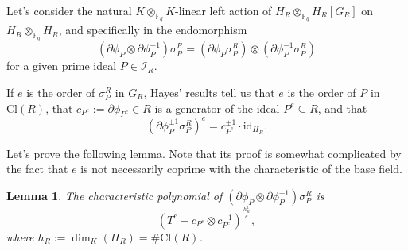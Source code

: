 \documentclass[11pt]{amsart}
\numberwithin{equation}{section}
\newcommand{\FF}{\mathbb{F}}
\newtheorem{Lemma}[Theorem]{Lemma}
\begin{document}
Let's consider the natural $K\otimes_{\FF_q} K$-linear left action of $H_R\otimes_{\FF_q} H_R[G_R]$ on $H_R\otimes_{\FF_q} H_R$, and specifically in the endomorphism \[(\partial\phi_P\otimes\partial\phi_P^{-1})\sigma^R_P=(\partial\phi_P\sigma^R_P)\otimes(\partial\phi_P^{-1}\sigma^R_P)\] for a given prime ideal $P\in \mathcal{I}_R$.



If $e$ is the order of ${\sigma^R_P}$ in $G_R$, Hayes' results tell us that $e$ is the order of $P$ in $\mathrm{Cl}(R)$, that $c_{P^e}:=\partial\phi_{P^e}\in R$ is a generator of the ideal $P^e\subseteq R$, and that \[(\partial\phi_P^{\pm1}\sigma^R_P)^e=c_{P^e}^{\pm1}\cdot\mathrm{id}_{H_R}.\]

Let's prove the following lemma. Note that its proof is somewhat complicated by the fact that $e$ is not necessarily coprime with the characteristic of the base field.
\begin{Lemma}
    The characteristic polynomial of $(\partial\phi_P\otimes\partial\phi_P^{-1})\sigma^R_P$ is
\[(T^e-c_{P^e}\otimes c_{P^e}^{-1})^\frac{h_R^2}{e},\]
where $h_R:=\dim_K(H_R)=\#\mathrm{Cl}(R)$.
\end{Lemma}
\end{document}

